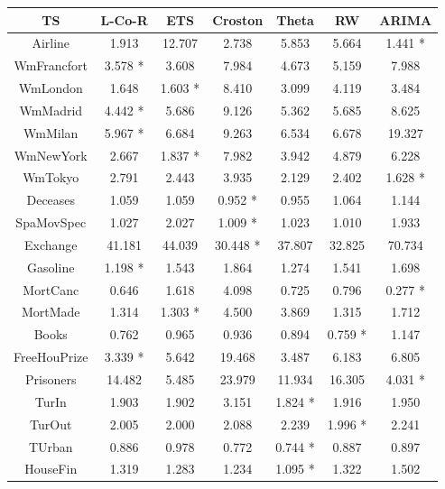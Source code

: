\documentclass[a4paper,twoside]{article}
\newcommand{\metodo}{L-Co-R}
\begin{document}
\begin{table*}[h]
\caption{Results of the methods {\metodo}, ETS, Croston, Theta, RW, and ARIMA, with respect to MASE. Best result per database is marked with character *.}
\label{tab:resultsMASE}
\centering
\begin{tabular}{|c|c|c|c|c|c|c|}
  \hline
  TS & {\metodo} & ETS & Croston & Theta & RW & ARIMA \\
  \hline Airline	&	1.913	&	12.707	&	2.738	&	5.853	&	5.664	&	1.441 *\\
  \hline WmFrancfort	&	3.578 *	&	3.608	&	7.984	&	4.673	&	5.159	&	7.988\\
  \hline WmLondon	&	1.648	&	1.603 *	&	8.410	&	3.099	&	4.119	&	3.484\\
  \hline WmMadrid	&	4.442 *	&	5.686	&	9.126	&	5.362	&	5.685	&	8.625\\
  \hline WmMilan	&	5.967 *	&	6.684	&	9.263	&	6.534	&	6.678	&	19.327\\
  \hline WmNewYork	&	2.667	&	1.837 *	&	7.982	&	3.942	&	4.879	&	6.228\\
  \hline WmTokyo	&	2.791	&	2.443	&	3.935	&	2.129	&	2.402	&	1.628 *\\
  \hline Deceases	&	1.059	&	1.059	&	0.952 *	&	0.955	&	1.064	&	1.144\\
  \hline SpaMovSpec	&	1.027	&	2.027	&	1.009 *	&	1.023	&	1.010	&	1.933\\
  \hline Exchange	&	41.181	&	44.039	&	30.448 *	&	37.807	&	32.825	&	70.734\\
  \hline Gasoline	&	1.198 *	&	1.543	&	1.864	&	1.274	&	1.541	&	1.698\\
  \hline MortCanc	&	0.646	&	1.618	&	4.098	&	0.725	&	0.796	&	0.277 *\\
  \hline MortMade	&	1.314	&	1.303 *	&	4.500	&	3.869	&	1.315	&	1.712\\
  \hline Books	&	0.762	&	0.965	&	0.936	&	0.894	&	0.759 *	&	1.147\\
  \hline FreeHouPrize	&	3.339 *	&	5.642	&	19.468	&	3.487	&	6.183	&	6.805\\
  \hline Prisoners	&	14.482	&	5.485	&	23.979	&	11.934	&	16.305	&	4.031 *\\
  \hline TurIn	&	1.903	&	1.902	&	3.151	&	1.824 *	&	1.916	&	1.950\\
  \hline TurOut	&	2.005	&	2.000	&	2.088	&	2.239	&	1.996 *	&	2.241\\
  \hline TUrban	&	0.886	&	0.978	&	0.772	&	0.744 *	&	0.887	&	0.897\\
  \hline HouseFin	&	1.319	&	1.283	&	1.234	&	1.095 *	&	1.322	&	1.502\\
  \hline
\end{tabular}
\end{table*}
\end{document}
